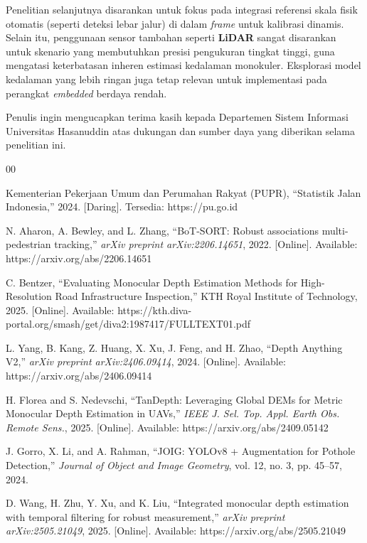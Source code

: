\documentclass{iopjournal}
\begin{document}
Penelitian selanjutnya disarankan untuk fokus pada integrasi referensi skala fisik otomatis (seperti deteksi lebar jalur) di dalam \textit{frame} untuk kalibrasi dinamis. Selain itu, penggunaan sensor tambahan seperti \textbf{LiDAR} sangat disarankan untuk skenario yang membutuhkan presisi pengukuran tingkat tinggi, guna mengatasi keterbatasan inheren estimasi kedalaman monokuler. Eksplorasi model kedalaman yang lebih ringan juga tetap relevan untuk implementasi pada perangkat \textit{embedded} berdaya rendah.

\ack
Penulis ingin mengucapkan terima kasih kepada Departemen Sistem Informasi Universitas Hasanuddin atas dukungan dan sumber daya yang diberikan selama penelitian ini.


\begin{thebibliography}{00}

Kementerian Pekerjaan Umum dan Perumahan Rakyat (PUPR), ``Statistik Jalan Indonesia,'' 2024. [Daring]. Tersedia: https://pu.go.id

N. Aharon, A. Bewley, and L. Zhang, ``BoT-SORT: Robust associations multi-pedestrian tracking,'' \emph{arXiv preprint arXiv:2206.14651}, 2022. [Online]. Available: https://arxiv.org/abs/2206.14651

C. Bentzer, ``Evaluating Monocular Depth Estimation Methods for High-Resolution Road Infrastructure Inspection,'' KTH Royal Institute of Technology, 2025. [Online]. Available: https://kth.diva-portal.org/smash/get/diva2:1987417/FULLTEXT01.pdf

L. Yang, B. Kang, Z. Huang, X. Xu, J. Feng, and H. Zhao, ``Depth Anything V2,'' \emph{arXiv preprint arXiv:2406.09414}, 2024. [Online]. Available: https://arxiv.org/abs/2406.09414

H. Florea and S. Nedevschi, ``TanDepth: Leveraging Global DEMs for Metric Monocular Depth Estimation in UAVs,'' \emph{IEEE J. Sel. Top. Appl. Earth Obs. Remote Sens.}, 2025. [Online]. Available: https://arxiv.org/abs/2409.05142

J. Gorro, X. Li, and A. Rahman, ``JOIG: YOLOv8 + Augmentation for Pothole Detection,'' \emph{Journal of Object and Image Geometry}, vol. 12, no. 3, pp. 45--57, 2024.


D. Wang, H. Zhu, Y. Xu, and K. Liu, ``Integrated monocular depth estimation with temporal filtering for robust measurement,'' \emph{arXiv preprint arXiv:2505.21049}, 2025. [Online]. Available: https://arxiv.org/abs/2505.21049


\end{thebibliography}
\end{document}
